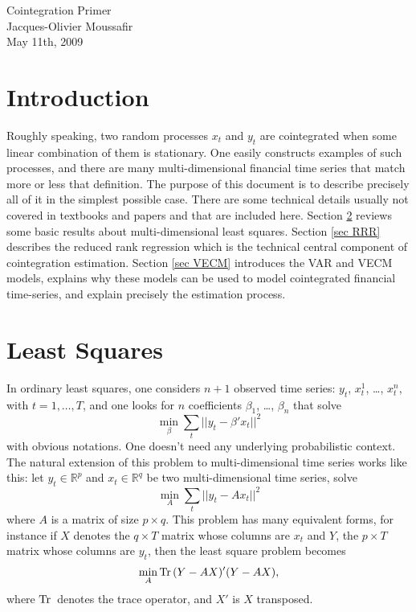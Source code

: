\documentclass[12pt, leqno]{article}
\newcommand{\norm}[1]{|| #1 ||}
\newcommand{\tr}{\text{\rm Tr}\,}
\newcommand{\real}{\mathbb{R}}
\newcounter{ex}
\newcounter{prob}
\begin{document}
\begin{center}
\noindent
{\Large Cointegration Primer} \\

\vspace{0.2cm}
{Jacques-Olivier Moussafir}\\

\vspace{0.2cm}
{May 11th, 2009}

\end{center}

\section{Introduction}
Roughly speaking, two random processes $x_t$ and $y_t$ are cointegrated when 
some linear combination of them is stationary. One easily constructs examples 
of such processes, and there are many multi-dimensional financial time series 
that match more or less that definition. The purpose of this document is to
describe precisely all of it in the simplest possible case. There are some 
technical details usually not covered in textbooks and papers and that 
are included here. Section \ref{sec LS} reviews some basic results about 
multi-dimensional least squares. Section \ref{sec RRR} describes the reduced
rank regression which is the technical central component of cointegration
estimation. Section \ref{sec VECM} introduces the VAR and VECM models, 
explains why these models can be used to model cointegrated financial time-series,
and explain precisely the estimation process.


\section{Least Squares}
\label{sec LS}
In ordinary least squares, one considers $n+1$ observed time series: $y_t$, $x_t^1$,
\ldots, $x_t^n$, with $t=1,\ldots, T$, and one looks for $n$ coefficients
$\beta_1$, \ldots, $\beta_n$ that solve
$$
\min_\beta \sum_t \norm{y_t - \beta' x_t}^2
$$
with obvious notations. One doesn't need any underlying probabilistic context.
The natural extension of this problem to multi-dimensional time series works like this:
let $y_t \in \real^p$ and $x_t \in \real^q$ be two multi-dimensional time series, solve
$$
\min_A \sum_t \norm{y_t - A x_t}^2
$$
where $A$ is a matrix of size $p\times q$. This problem has many equivalent forms, 
for instance if $X$ denotes the $q \times T$ matrix whose columns are $x_t$ 
and $Y$, the $p\times T$ matrix whose columns are $y_t$, then the least square
problem becomes
\begin{equation}
\label{eq LS-Tr}
\min_A \tr (Y - A X)' (Y - A X),
\end{equation}
where $\tr$ denotes the trace operator, and $X'$ is $X$ transposed.
\end{document}
